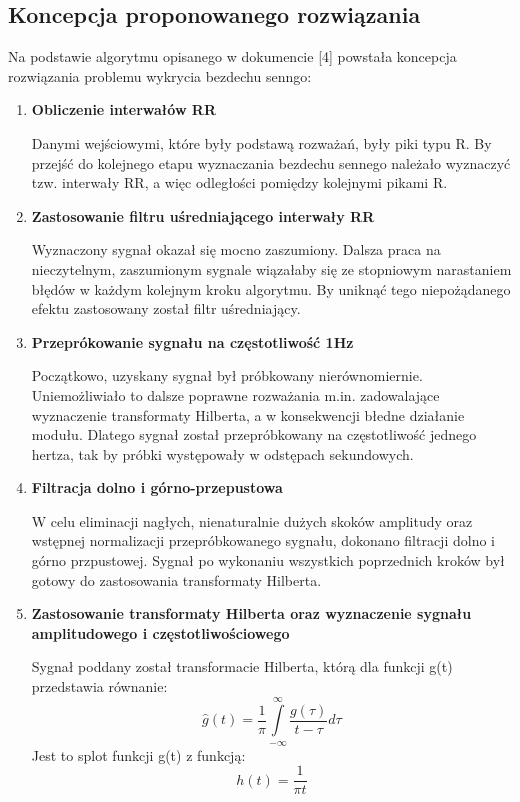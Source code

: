 \subsection{Koncepcja proponowanego rozwiązania}
Na podstawie algorytmu opisanego w dokumencie [4] powstała koncepcja rozwiązania problemu wykrycia bezdechu senngo:
\begin{enumerate}
 \item \textbf{Obliczenie interwałów RR}
 
 Danymi wejściowymi, które były podstawą rozważań, były piki typu R. By przejść do kolejnego etapu wyznaczania bezdechu sennego należało wyznaczyć tzw. interwały RR, a więc odległości pomiędzy kolejnymi pikami R.
 \item \textbf{Zastosowanie filtru uśredniającego interwały RR}
 
 Wyznaczony sygnał okazał się mocno zaszumiony. Dalsza praca na nieczytelnym, zaszumionym sygnale wiązałaby się ze stopniowym narastaniem błędów w każdym kolejnym kroku algorytmu. By uniknąć tego niepożądanego efektu zastosowany został filtr uśredniający.
 \item \textbf{Przeprókowanie sygnału na częstotliwość 1Hz}
 
 Początkowo, uzyskany sygnał był próbkowany nierównomiernie. Uniemożliwiało to dalsze poprawne rozważania m.in. zadowalające wyznaczenie transformaty Hilberta, a w konsekwencji błedne działanie modułu. Dlatego sygnał został przepróbkowany na częstotliwość jednego hertza, tak by próbki występowały w odstępach sekundowych.
 \item \textbf{Filtracja dolno i górno-przepustowa}
 
 W celu eliminacji nagłych, nienaturalnie dużych skoków amplitudy oraz wstępnej normalizacji przepróbkowanego sygnału, dokonano filtracji dolno i górno przpustowej. Sygnał po wykonaniu wszystkich poprzednich kroków był gotowy do zastosowania transformaty Hilberta.
 \item \textbf{Zastosowanie transformaty Hilberta oraz wyznaczenie sygnału amplitudowego i częstotliwościowego}
 
 Sygnał poddany został transformacie Hilberta, którą dla funkcji g(t) przedstawia równanie:
 \begin{equation}
 \widehat{g}(t) = \frac{1}{\pi}\int\limits_{-\infty}^{\infty} \frac{g(\tau)}{t-\tau} d\tau
 \end{equation}
 Jest to splot funkcji g(t) z funkcją:
 \begin{equation}
 h(t) = \frac{1}{\pi t}
 \end{equation}
 

\end{enumerate}
